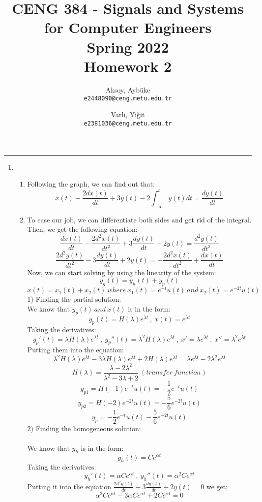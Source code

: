 \documentclass[10pt,a4paper, margin=1in]{article}
\author{
  Aksoy, Aybüke\\
  \texttt{e2448090@ceng.metu.edu.tr}
  \and
  Varlı, Yiğit\\
  \texttt{e2381036@ceng.metu.edu.tr}
}
\title{CENG 384 - Signals and Systems for Computer Engineers \\
Spring 2022 \\
Homework 2}
\begin{document}
\maketitle



\noindent\rule{19cm}{1.2pt}

\begin{enumerate}

\item %
    \begin{enumerate}
    \item Following the graph, we can find out that:
    \[x(t)-\frac{2dx(t)}{dt}+ 3y(t)-2 \int_{-\infty}^{t} y(t)dt=\frac{dy(t)}{dt} \]
    \item To ease our job, we can differentiate both sides and get rid of the integral. Then, we get the following equation:
    \[\frac{dx(t)}{dt}-\frac{2d^2x(t)}{dt^2}+ 3\frac{dy(t)}{dt}-2y(t)=\frac{d^2y(t)}{dt^2} \]
    \[\frac{2d^2y(t)}{dt^2}- 3\frac{dy(t)}{dt}+2y(t)=-\frac{2d^2x(t)}{dt^2}+\frac{dx(t)}{dt}\]
    Now, we can start solving by using the linearity of the system:
    \[y_g(t)=y_h(t)+y_p(t)\]
     \[x(t)=x_1(t)+x_2(t) \ where \ x_1(t)=e^{-t}u(t) \ and \ x_2(t)=e^{-2t}u(t)\] 
     1) Finding the partial solution:\\
     We know that $y_p(t) \ and \ x(t)$ is in the form:
      \[y_p(t)=H(\lambda)e^{\lambda t} \ , \ x(t)=e^{\lambda t}\] 
    Taking the derivatives:
     \[y_p'(t)=\lambda H(\lambda)e^{\lambda t} \ , \ y_p''(t)=\lambda^{2}H(\lambda)e^{\lambda t} \ , \ 
     x'=\lambda e^{\lambda t} \ , \ x''=\lambda^{2} e^{\lambda t}
     \] 
     Putting them into the equation:
     \[\lambda^{2} H(\lambda)e^{\lambda t}-3\lambda H(\lambda)e^{\lambda t}+2 H(\lambda)e^{\lambda t}=\lambda e^{\lambda t}-2\lambda^{2} e^{\lambda t} \]
     \[H(\lambda)= \frac{\lambda-2\lambda^2}{\lambda^2-3\lambda +2} \ (transfer \  function)\]
     \[y_{p1}=H(-1)e^{-t}u(t)=-\frac{1}{2}e^{-t}u(t)\]
     \[y_{p2}=H(-2)e^{-2t}u(t)=-\frac{5}{6}e^{-2t}u(t)\]
     \[y_{p}=-\frac{1}{2}e^{-t}u(t) -\frac{5}{6}e^{-2t}u(t)\]
     2) Finding the homogeneous solution:\\\\
     We know that $y_h$ is in the form:
     \[y_h(t)=Ce^{\alpha t}\]
     Taking the derivatives:
     \[y_h'(t)=\alpha Ce^{\alpha t} \ , \ y_h''(t)=\alpha^2 Ce^{\alpha t}\]
     Putting it into the equation $\frac{2d^2y(t)}{dt}- 3\frac{dy(t)}{dt}+2y(t)=0$ we get;
     \[\alpha^2 Ce^{\alpha t}-3\alpha Ce^{\alpha t}+2Ce^{\alpha t} = 0\]

\end{enumerate}
\end{enumerate}
\end{document}
